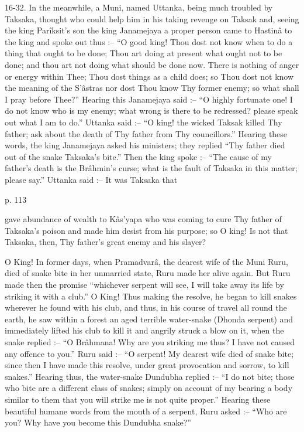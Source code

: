  

16-32. In the meanwhile, a Muni, named Uttanka, being much troubled by Taksaka, thought who could help him in his taking revenge on Taksak and, seeing the king Parîksit's son the king Janamejaya a proper person came to Hastinâ to the king and spoke out thus :-- “O good king! Thou dost not know when to do a thing that ought to be done; Thou art doing at present what ought not to be done; and thou art not doing what should be done now. There is nothing of anger or energy within Thee; Thou dost things as a child does; so Thou dost not know the meaning of the S’âstras nor dost Thou know Thy former enemy; so what shall I pray before Thee?”  Hearing this Janamejaya said :-- “O highly fortunate one! I do not know who is my enemy; what wrong is there to be redressed? please speak out what I am to do.” Uttanka said :-- “O king! the wicked Taksak killed Thy father; ask about the death of Thy father from Thy councillors.” Hearing these words, the king Janamejaya asked his ministers; they replied “Thy father died out of the snake Taksaka's bite.” Then the king spoke :-- “The cause of my father's death is the Brâhmin's curse; what is the fault of Taksaka in this matter; please say.” Uttanka said :-- It was Taksaka that

 

p. 113

 

gave abundance of wealth to Kâs'yapa who was coming to cure Thy father of Taksaka's poison and made him desist from his purpose; so O king! Is not that Taksaka, then, Thy father's great enemy and his slayer?

 

O King! In former days, when Pramadvarâ, the dearest wife of the Muni Ruru, died of snake bite in her unmarried state, Ruru made her alive again. But Ruru made then the promise “whichever serpent will see, I will take away its life by striking it with a club.” O King! Thus making the resolve, he began to kill snakes wherever he found with his club, and thus, in his course of travel all round the earth, he saw within a forest an aged terrible water-snake (Dhonda serpent) and immediately lifted his club to kill it and angrily struck a blow on it, when the snake replied :-- “O Brâhmana! Why are you striking me thus? I have not caused any offence to you.” Ruru said :-- “O serpent! My dearest wife died of snake bite; since then I have made this resolve, under great provocation and sorrow, to kill snakes.” Hearing thus, the water-snake Dundubha replied :-- “I do not bite; those who bite are a different class of snakes; simply on account of my bearing a body similar to them that you will strike me is not quite proper.” Hearing these beautiful humane words from the mouth of a serpent, Ruru asked :-- “Who are you? Why have you become this Dundubha snake?”

